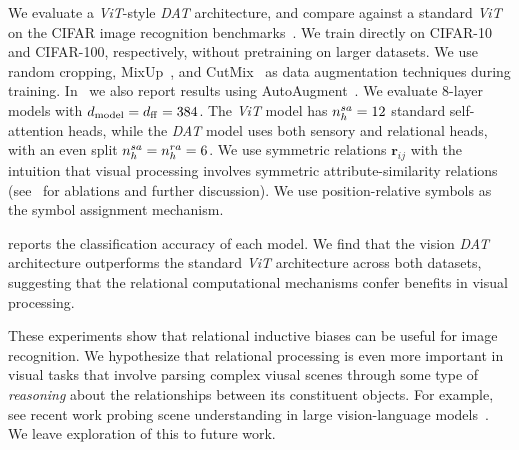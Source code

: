 We evaluate a \textit{ViT}-style \textit{DAT} architecture, and compare against a standard \textit{ViT} on the CIFAR image recognition benchmarks~\citep{cifar_dataset}. We train directly on CIFAR-10 and CIFAR-100, respectively, without pretraining on larger datasets. We use random cropping, MixUp~\citep{zhang2018mixup}, and CutMix~\citep{yun2019cutmix} as data augmentation techniques during training. In~ we also report results using AutoAugment~\citep{cubuk2019autoaugmentlearningaugmentationpolicies}. We evaluate 8-layer models with $d_{\mathrm{model}} = d_{\mathrm{ff}} = 384$. The \textit{ViT} model has $n_h^{sa} = 12$ standard self-attention heads, while the \textit{DAT} model uses both sensory and relational heads, with an even split $n_h^{sa} = n_h^{ra} = 6$. We use symmetric relations $\bm{r}_{ij}$ with the intuition that visual processing involves symmetric attribute-similarity relations (see~ for ablations and further discussion). We use position-relative symbols as the symbol assignment mechanism.

 reports the classification accuracy of each model. We find that the vision \textit{DAT} architecture outperforms the standard \textit{ViT} architecture across both datasets, suggesting that the relational computational mechanisms confer benefits in visual processing.

These experiments show that relational inductive biases can be useful for image recognition. We hypothesize that relational processing is even more important in visual tasks that involve parsing complex viusal scenes through some type of \textit{reasoning} about the relationships between its constituent objects. For example, see recent work probing scene understanding in large vision-language models~\citep{johnson2017clevr,zerroug2022benchmark,zhao2024benchmarking}. We leave exploration of this to future work.




